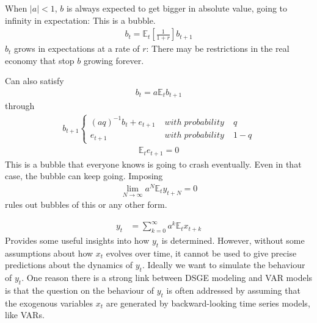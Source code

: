 \documentclass{beamer}
\begin{document}
\begin{frame}
  When $|a|<1$, $b$ is always expected to get bigger in absolute value, going to infinity in expectation: This is a bubble.
  \begin{align}
    b_t=\mathbb{E}_t \left[\frac{1}{1+r} \right] b_{t+1}
  \end{align}
  $b_t$ grows in expectations at a rate of $r$: There may be restrictions in the real economy that stop $b$ growing forever.


\end{frame}

\begin{frame}
  Can also satisfy 
  \begin{align}
    b_t = a\mathbb{E}_tb_{t+1} 
  \end{align}
  through
\begin{align}
  b_{t+1} \left\{\begin{matrix}
  (aq)^{-1}b_t + e_{t+1} & \;with\;probability\; &q
\\ e_{t+1} & \;with\;probability\;&1-q
\end{matrix}\right.   
\end{align}
\begin{align}
  \mathbb{E}_te_{t+1}=0
\end{align}
This is a bubble that everyone knows is going to crash eventually. 
Even in that case, the bubble can keep going. 
Imposing 
\begin{align}
  \lim_{N \rightarrow \infty} a^N\mathbb{E}_ty_{t+N}=0
\end{align}
rules out bubbles of this or any other form.
\end{frame}

\begin{frame}
  \begin{align}  y_t &= \sum^\infty_{k=0}a^k\mathbb{E}_tx_{t+k}  \end{align}
Provides some useful insights into how $y_t$ is determined. 
However, without some assumptions about how $x_t$ evolves over time, it cannot be used to give precise predictions about the dynamics of $y_t$. 
Ideally we want to simulate the behaviour of $y_t$. 
One reason there is a strong link between DSGE modeling and VAR models is that the question on the behaviour of $y_t$ is often  addressed by assuming that the exogenous variables $x_t$ are generated by backward-looking time series models, like VARs.
\end{frame}
\end{document}
